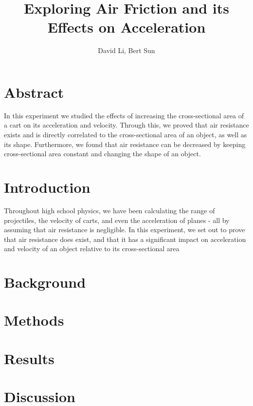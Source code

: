 \documentclass[
    letterpaper,
    man,
    floatsintext,
    british
]{apa6}
\title{Exploring Air Friction and its Effects on Acceleration}
\author{David Li, Bert Sun}
\affiliation{John Fraser Secondary School}
\begin{document}
\maketitle

\section{Abstract}
In this experiment we studied the effects of increasing the cross-sectional area of a cart on its acceleration and velocity.
Through this, we proved that air resistance exists and is directly correlated to the cross-sectional area of an object, as well as its shape. Furthermore, we found that air resistance can be decreased by keeping cross-sectional area constant and changing the shape of an object.

\section{Introduction}

Throughout high school physics, we have been calculating the range of projectiles, the velocity of carts, and even the acceleration of planes - all by assuming that air resistance is negligible.
In this experiment, we set out to prove that air resistance does exist, and that it has a significant impact on acceleration and velocity of an object relative to its cross-sectional area

\section{Background}


\section{Methods}



\newpage
\section{Results}


\section{Discussion}


\nocite{*}
\printbibliography


\end{document}
